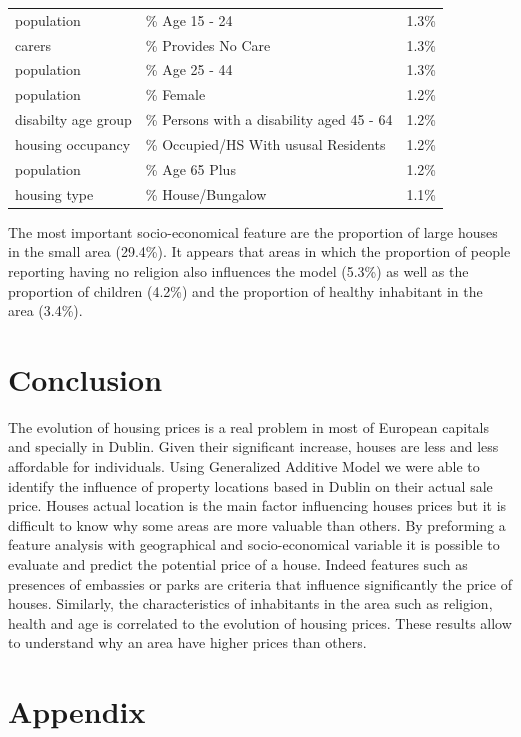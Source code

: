 \documentclass[]{elsarticle} %
\begin{document}
\begin{table}[!h]
\begin{tabular}{>{\raggedright\arraybackslash}p{1in}>{\raggedright\arraybackslash}p{3in}l}
population & \% Age 15 - 24 & 1.3\%\\
carers & \% Provides No Care & 1.3\%\\
population & \% Age 25 - 44 & 1.3\%\\
population & \% Female & 1.2\%\\
disabilty age group & \% Persons with a disability aged 45 - 64 & 1.2\%\\
housing occupancy & \% Occupied/HS With ususal Residents & 1.2\%\\
population & \% Age 65 Plus & 1.2\%\\
housing type & \% House/Bungalow & 1.1\%\\
\bottomrule
\end{tabular}
\end{table}

The most important socio-economical feature are the proportion of large
houses in the small area (29.4\%). It appears that areas in which the
proportion of people reporting having no religion also influences the
model (5.3\%) as well as the proportion of children (4.2\%) and the
proportion of healthy inhabitant in the area (3.4\%).

\section{Conclusion}\label{conclusion}

The evolution of housing prices is a real problem in most of European
capitals and specially in Dublin. Given their significant increase,
houses are less and less affordable for individuals. Using Generalized
Additive Model we were able to identify the influence of property
locations based in Dublin on their actual sale price. Houses actual
location is the main factor influencing houses prices but it is
difficult to know why some areas are more valuable than others. By
preforming a feature analysis with geographical and socio-economical
variable it is possible to evaluate and predict the potential price of a
house. Indeed features such as presences of embassies or parks are
criteria that influence significantly the price of houses. Similarly,
the characteristics of inhabitants in the area such as religion, health
and age is correlated to the evolution of housing prices. These results
allow to understand why an area have higher prices than others.

\section{Appendix}\label{appendix}
\end{document}
